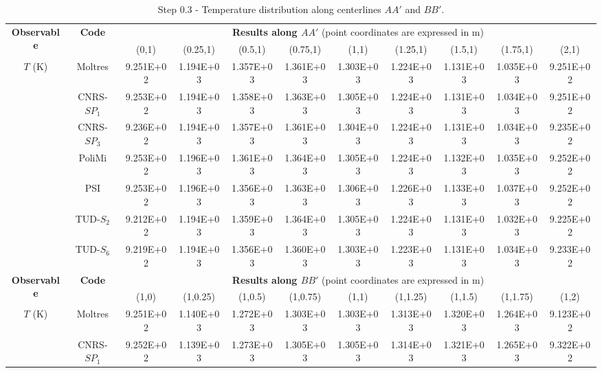\begin{table}[htbp!]
	\caption{Step 0.3 - Temperature distribution along centerlines $AA'$ and $BB'$.}
	\centering
	\footnotesize
	\setlength\tabcolsep{1.5pt}
	\hspace*{-2cm}
	\renewcommand{\arraystretch}{.8}
	\begin{tabular}{c c c c c c c c c c c}
		\toprule
		\multirow{2}{*}{\textbf{Observable}} & \multirow{2}{*}{\textbf{Code}} & \multicolumn{9}{c}{\textbf{Results along $AA'$} (point coordinates are expressed in m)} \\
		& & {(0,1)} & {(0.25,1)} & {(0.5,1)} & {(0.75,1)} & {(1,1)} & {(1.25,1)} & {(1.5,1)} & {(1.75,1)} & {(2,1)} \\
		\midrule
		\multirow{7}{*}{$T$ (K)} & Moltres & 9.251E+02 & 1.194E+03 & 1.357E+03 & 1.361E+03 &
		1.303E+03 & 1.224E+03 & 1.131E+03 & 1.035E+03 & 9.251E+02 \\
		& CNRS-$SP_1$ & 9.253E+02 & 1.194E+03 & 1.358E+03 & 1.363E+03 & 1.305E+03 & 1.224E+03 & 1.131E+03 & 1.034E+03 & 9.251E+02 \\
		& CNRS-$SP_3$ & 9.236E+02 & 1.194E+03 & 1.357E+03 & 1.361E+03 & 1.304E+03 & 1.224E+03 & 1.131E+03 & 1.034E+03 & 9.235E+02 \\
		& PoliMi & 9.253E+02 & 1.196E+03 & 1.361E+03 & 1.364E+03 & 1.305E+03 & 1.224E+03 & 1.132E+03 & 1.035E+03 & 9.252E+02 \\
		& PSI & 9.253E+02 & 1.196E+03 & 1.356E+03 & 1.363E+03 & 1.306E+03 & 1.226E+03 & 1.133E+03 & 1.037E+03 & 9.252E+02 \\
		& TUD-$S_2$ & 9.212E+02 & 1.194E+03 & 1.359E+03 & 1.364E+03 & 1.305E+03 & 1.224E+03 & 1.131E+03 & 1.032E+03 & 9.225E+02 \\
		& TUD-$S_6$ & 9.219E+02 & 1.194E+03 & 1.356E+03 & 1.360E+03 & 1.303E+03 & 1.223E+03 & 1.131E+03 & 1.034E+03 & 9.233E+02 \\
		\midrule
		\midrule
		\multirow{2}{*}{\textbf{Observable}} & \multirow{2}{*}{\textbf{Code}} & \multicolumn{9}{c}{\textbf{Results along $BB'$} (point coordinates are expressed in m)} \\
		& & {(1,0)} & {(1,0.25)} & {(1,0.5)} & {(1,0.75)} & {(1,1)} & {(1,1.25)} & {(1,1.5)} & {(1,1.75)} & {(1,2)} \\
		\midrule
		\multirow{7}{*}{$T$ (K)} & Moltres & 9.251E+02 & 1.140E+03 & 1.272E+03 & 1.303E+03 &
		1.303E+03 & 1.313E+03 & 1.320E+03 & 1.264E+03 & 9.123E+02 \\
		& CNRS-$SP_1$ & 9.252E+02 & 1.139E+03 & 1.273E+03 & 1.305E+03 & 1.305E+03 & 1.314E+03 & 1.321E+03 & 1.265E+03 & 9.322E+02 \\

\end{tabular}
\end{table}
